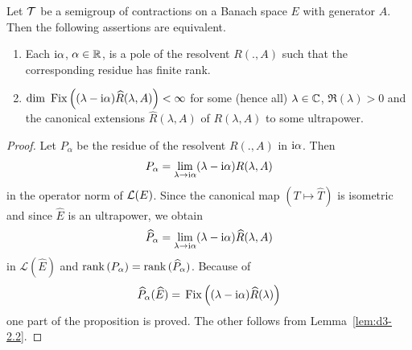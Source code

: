 \begin{proposition}\label{prop:d3-2.3}
Let $\mathcal{T}$ be a semigroup of contractions on a Banach space $E$ with generator $A$.
Then the following assertions are equivalent.
\begin{enumerate}[\upshape (a)]

\item
Each $\mathrm{i}\alpha$, $\alpha \in \mathbb{R}$, is a pole of the resolvent $R(.,A)$ such that the corresponding residue has finite rank.

\item
$\mathop{}\!\mathrm{dim}\, \mathop{}\mathrm{Fix}\left((\lambda - \mathrm{i}\alpha)\widehat{R}(\lambda,A)\right) < \infty$ for some (hence all) $\lambda \in \mathbb{C}$, $\Re(\lambda) > 0$ and the canonical extensions $\widehat{R}(\lambda,A)$ of\/ $R(\lambda,A)$ to some ultrapower.

\end{enumerate}
\end{proposition}
\begin{proof}
Let $P_{\alpha}$ be the residue of the resolvent $R(.,A)$ in $\mathrm{i}\alpha$.
Then 
\[
P_{\alpha} = \lim_{\lambda \to \mathrm{i}\alpha}(\lambda - \mathrm{i}\alpha)R(\lambda,A)
\]
in the operator norm of\/ $\mathcal{L}(E)$.
Since the canonical map $(T \mapsto \widehat{T})$ is isometric and since $\widehat{E}$ is an ultrapower, we obtain
\[
\widehat{P}_{\alpha} = \lim_{\lambda \to \mathrm{i}\alpha}(\lambda - \mathrm{i}\alpha)\widehat{R}(\lambda,A)
\]
in $\mathcal{L}(\widehat{E})$ and $\mathop{}\!\mathrm{rank}\,(P_{\alpha}) = \mathop{}\!\mathrm{rank}\,(\widehat{P}_{\alpha})$.
Because of
\[
\widehat{P}_{\alpha}(\widehat{E}) = \mathop{}\mathrm{Fix}\left((\lambda-\mathrm{i}\alpha)\widehat{R}(\lambda)\right)
\]
one part of the proposition is proved. The other follows from Lemma~\ref{lem:d3-2.2}.
\end{proof}
